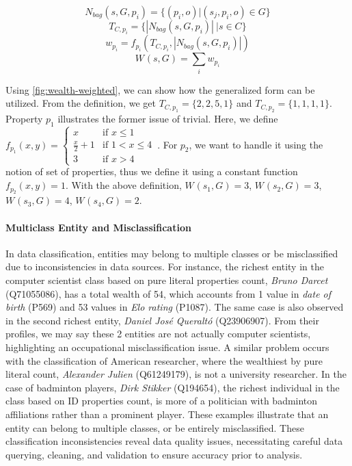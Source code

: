 \[
    N_{bag}(s,G,p_i) = \{(p_i,o) | (s_j, p_i, o) \in G\}
\]
\[
    T_{C,p_i} = \{|N_{bag}(s,G,p_i)|\ | s \in C\}
\]
\[
    w_{p_i} = f_{p_i}(T_{C,p_i}, |N_{bag}(s,G,p_i)|)
\]
\[
    W_{}(s, G) = \sum_i w_{p_i}
\]

Using \autoref{fig:wealth-weighted}, we can show how the generalized form can be utilized. From the definition, we get \(T_{C,p_1} = \{2, 2, 5, 1\}\) and \(T_{C,p_2} = \{1, 1, 1, 1\}\). Property \(p_1\) illustrates the former issue of trivial. Here, we define $f_{p_1}(x,y) = \begin{cases}
      x & \text{if }x \leq 1 \\
      \frac{x}{2} + 1 & \text{if }1 < x \leq 4 \\
      3 & \text{if }x > 4
    \end{cases}\, $.
For \(p_2\), we want to handle it using the notion of set of properties, thus we define it using a constant function \(f_{p_2}(x,y) = 1\).
With the above definition, \(W_{}(s_1, G) = 3\), \(W_{}(s_2, G) = 3\), \(W_{}(s_3, G) = 4\), \(W_{}(s_4, G) = 2\).

\paragraph{Multiclass Entity and Misclassification}
In data classification, entities may belong to multiple classes or be misclassified due to inconsistencies in data sources. For instance, the richest entity in the computer scientist class based on pure literal properties count, \textit{Bruno Darcet} (Q71055086), has a total wealth of 54, which accounts from 1 value in \textit{date of birth} (P569) and 53 values in \textit{Elo rating} (P1087). The same case is also observed in the second richest entity, \textit{Daniel José Queraltó} (Q23906907). From their profiles, we may say these 2 entities are not actually computer scientists, highlighting an occupational misclassification issue. A similar problem occurs with the classification of American researcher, where the wealthiest by pure literal count, \textit{Alexander Julien} (Q61249179), is not a university researcher. In the case of badminton players, \textit{Dirk Stikker} (Q194654), the richest individual in the class based on ID properties count, is more of a politician with badminton affiliations rather than a prominent player. These examples illustrate that an entity can belong to multiple classes, or be entirely misclassified. These classification inconsistencies reveal data quality issues, necessitating careful data querying, cleaning, and validation to ensure accuracy prior to analysis.